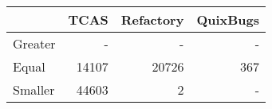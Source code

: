 \begin{tabular}{lrrr}
\toprule
 & \textbf{TCAS} & \textbf{Refactory} & \textbf{QuixBugs} \\
\midrule
Greater & - & - & - \\
Equal & 14107 & 20726 & 367 \\
Smaller & 44603 & 2 & - \\
\bottomrule
\end{tabular}
